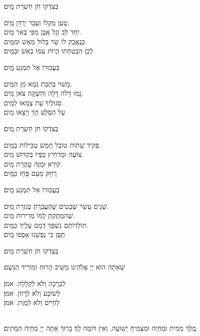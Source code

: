 \documentclass[twoside, openany, parskip=half, 11pt]{book}
\begin{document}
\kahal
 בְּצִדְקוֹ חֹן חַשְׁרַת מָֽיִם׃

 טָעַן מַקְלוֹ וְעָבַר יַרְדֵּן \hfill מַֽיִם.\\
יִֽחַד לֵב וְגָל אֶֽבֶן מִפִּי בְּאֵר \hfill מַֽיִם.\\
כְּנֶאֱבַק לוֹ שַׂר בָּלוּל מֵאֵשׁ \hfill וּמִמַּֽיִם.\\
לָכֵן הִבְטַחְתּוֹ הֱיוֹת עִמּוֹ בָּאֵשׁ \hfill וּבַמָּֽיִם׃

\kahal
 בַּעֲבוּרוֹ אַל תִּמְנַע מָֽיִם׃

 מָשׁוּי בְּתֵבַת גֹּֽמֶא מִן \hfill הַמַּֽיִם.\\
נָֽמוּ דָלֹה דָלָה וְהִשְׁקָה צֹאן \hfill מַֽיִם.\\
סְגוּלֶֽיךָ עֵת צָמְאוּ \hfill לְמַֽיִם.\\
עַל הַסֶּֽלַע הָךְ וַיֵצְאוּ \hfill מַֽיִם׃

\kahal
 בְּצִדְקוֹ חֹן חַשְׁרַת מָֽיִם׃

 פְּקִיד שָׁתוֹת טוֹבֵל חָמֵשׁ טְבִילוֹת \hfill בַּמַּֽיִם.\\
צוֹעֶה וּמַרְחִיץ כַּפָּיו בְּקִדּוּשׁ \hfill מַֽיִם.\\
קוֹרֵא וּמַזֶּה טׇהֳרַת \hfill מַֽיִם.\\
רֻחַק מֵעַם פַּֽחַז \hfill כַּמָּֽיִם׃

\kahal 
בַּעֲבוּרוֹ אַל תִּמְנַע מָֽיִם׃

 שְׁנֵים עָשָׂר שְׁבָטִים שֶׁהֶעֱבַֽרְתָּ בְּגִזְרַת \hfill מַֽיִם.\\
שֶׁהִמְתַּֽקְתָּ לָֽמוֹ מְרִירוּת \hfill מַֽיִם.\\
תּוֹלְדוֹתָם נִשְׁפַּךְ דָּמָם עָלֶֽיךָ \hfill כַּמַּֽיִם.\\
תֵּֽפֶן כִּי נַפְשֵֽׁנוּ אָפְפוּ \hfill מָֽיִם׃

\kahal
 בְּצִדְקוֹ חֹן חַשְׁרַת מָֽיִם׃

שָׁאַתָּה הוּא יְיָ אֱלֹהֵינוּ מַשִּׁיב הָרוּחַ וּמוֹרִיד הַגָּשֶׁם׃

לִבְרָכָה וְלֹא לִקְלָלָה. \hfill \kahal אמן׃\\
לְשׂוֹבַע וְלֹא לְרָזוֹן. \hfill \kahal אמן׃\\
לְחַיִּים וְלֹא לַמָּוֶת. \hfill \kahal אמן׃

\\
מֶֽלֶךְ מֵמִית וּמְחַיֶּה וּמַצְמִֽיחַ יְשׁוּעָה, וְאֵין דּוֹמֶה לָךְ׃ בָּרוּךְ אַתָּה יְיָ מְחַיֵּה הַמֵּתִים׃

\end{document}
